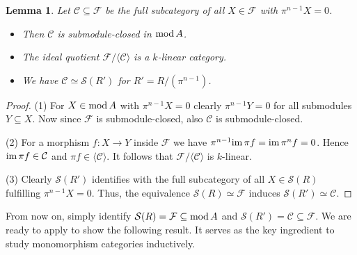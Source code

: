 \documentclass[a4paper]{amsart}
\renewcommand{\mod}{\textnormal{mod}\,}
\newcommand{\im}{\textnormal{im}\,}
\numberwithin{equation}{section} \theoremstyle{plain}
\numberwithin{thm}{section}
\newtheorem{lem}[thm]{Lemma}
\begin{document}
\begin{lem}\label{L: sub} Let $\mathcal{C} \subseteq \mathcal{F}$ be the full subcategory of all $X\in \mathcal{F}$ with $\pi^{n-1}X = 0$.
\begin{itemize}
    \item[(1)] Then $\mathcal{C}$ is submodule-closed in $\mod A$.
    \item[(2)] The ideal quotient $\mathcal{F}/\langle \mathcal{C} \rangle$ is a $k$-linear category.
    \item[(3)] We have $\mathcal{C} \simeq \mathcal{S}(R')$ for $R' = R/(\pi^{n-1})$.
\end{itemize}
\end{lem}
\begin{proof} (1) For $X\in \mod A$ with $\pi^{n-1} X =0$ clearly $\pi^{n-1} Y =0$ for all submodules $Y\subseteq X$. Now since $\mathcal{F}$ is submodule-closed, also $\mathcal{C}$ is submodule-closed.

(2) For a morphism $f\colon X\to Y$ inside $\mathcal{F}$ we have $\pi^{n-1} \im \pi f =\im  \pi^n f = 0$. Hence $\im \pi f \in \mathcal{C}$ and $\pi f\in \langle \mathcal{C} \rangle$. It follows that  $\mathcal{F}/\langle \mathcal{C} \rangle$ is $k$-linear. 

(3) Clearly $\mathcal{S}(R')$ identifies with the full subcategory of all $X\in \mathcal{S}(R)$ fulfilling $\pi^{n-1} X =0$. Thus, the equivalence $\mathcal{S}(R) \simeq \mathcal{F}$ induces $\mathcal{S}(R') \simeq \mathcal{C}$.
\end{proof}

From now on, simply identify $\mathcal{S}(R) = \mathcal{F}\subseteq \mod A$ and $\mathcal{S}(R') = \mathcal{C} \subseteq \mathcal{F}$. We are ready to apply  to show the following result. It serves as the key ingredient to study monomorphism categories inductively. 
\end{document}
